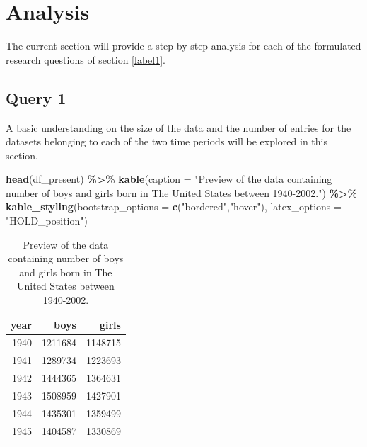 \documentclass[11pt,a4paper,]{article}
\newenvironment{Shaded}{\begin{snugshade}}{\end{snugshade}}
\newcommand{\AttributeTok}[1]{\textcolor[rgb]{0.13,0.29,0.53}{#1}}
\newcommand{\FunctionTok}[1]{\textcolor[rgb]{0.13,0.29,0.53}{\textbf{#1}}}
\newcommand{\NormalTok}[1]{#1}
\newcommand{\SpecialCharTok}[1]{\textcolor[rgb]{0.81,0.36,0.00}{\textbf{#1}}}
\newcommand{\StringTok}[1]{\textcolor[rgb]{0.31,0.60,0.02}{#1}}
\begin{document}
\hypertarget{label2}{%
\section{Analysis}\label{label2}}

The current section will provide a step by step analysis for each of the formulated research questions of section \ref{label1}.

\hypertarget{query-1}{%
\subsection{Query 1}\label{query-1}}

A basic understanding on the size of the data and the number of entries for the datasets belonging to each of the two time periods will be explored in this section.

\begin{Shaded}
\begin{Highlighting}[]
\FunctionTok{head}\NormalTok{(df\_present) }\SpecialCharTok{\%\textgreater{}\%} \FunctionTok{kable}\NormalTok{(}\AttributeTok{caption =} \StringTok{"Preview of the data containing number of boys and girls born in The United States between 1940{-}2002."}\NormalTok{) }\SpecialCharTok{\%\textgreater{}\%} 
  \FunctionTok{kable\_styling}\NormalTok{(}\AttributeTok{bootstrap\_options =} \FunctionTok{c}\NormalTok{(}\StringTok{"bordered"}\NormalTok{,}\StringTok{"hover"}\NormalTok{),}
                                    \AttributeTok{latex\_options =} \StringTok{"HOLD\_position"}\NormalTok{) }
\end{Highlighting}
\end{Shaded}

\begin{table}[H]

\caption{\label{tab:tabpre}Preview of the data containing number of boys and girls born in The United States between 1940-2002.}
\centering
\begin{tabular}[t]{r|r|r}
\hline
year & boys & girls\\
\hline
1940 & 1211684 & 1148715\\
\hline
1941 & 1289734 & 1223693\\
\hline
1942 & 1444365 & 1364631\\
\hline
1943 & 1508959 & 1427901\\
\hline
1944 & 1435301 & 1359499\\
\hline
1945 & 1404587 & 1330869\\
\hline
\end{tabular}
\end{table}
\end{document}
